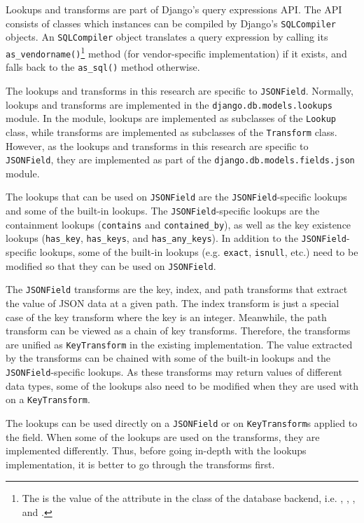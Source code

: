 Lookups and transforms are part of Django's query expressions API. The API
consists of classes which instances can be compiled by Django's
\verb|SQLCompiler| objects. An \verb|SQLCompiler| object translates a query
expression by calling its \verb|as_vendorname()|\footnote{The 
is the value of the  attribute in the  class
of the database backend, i.e. , , ,
and .} method (for vendor-specific implementation) if it exists,
and falls back to the \verb|as_sql()| method otherwise.

The lookups and transforms in this research are specific to \verb|JSONField|.
Normally, lookups and transforms are implemented in the
\verb|django.db.models.lookups| module. In the module, lookups are implemented
as subclasses of the \verb|Lookup| class, while transforms are implemented as
subclasses of the \verb|Transform| class. However, as the lookups and
transforms in this research are specific to \verb|JSONField|, they are
implemented as part of the \verb|django.db.models.fields.json| module.

The lookups that can be used on \verb|JSONField| are the
\verb|JSONField|-specific lookups and some of the built-in lookups. The
\verb|JSONField|-specific lookups are the containment lookups (\verb|contains|
and \verb|contained_by|), as well as the key existence lookups (\verb|has_key|,
\verb|has_keys|, and \verb|has_any_keys|). In addition to the
\verb|JSONField|-specific lookups, some of the built-in lookups (e.g.
\verb|exact|, \verb|isnull|, etc.) need to be modified so that they can be used
on \verb|JSONField|.

The \verb|JSONField| transforms are the key, index, and path transforms that
extract the value of JSON data at a given path. The index transform is just a
special case of the key transform where the key is an integer. Meanwhile, the
path transform can be viewed as a chain of key transforms. Therefore, the
transforms are unified as \verb|KeyTransform| in the existing implementation.
The value extracted by the transforms can be chained with some of the built-in
lookups and the \verb|JSONField|-specific lookups. As these transforms may
return values of different data types, some of the lookups also need to be
modified when they are used with on a \verb|KeyTransform|.

The lookups can be used directly on a \verb|JSONField| or on
\verb|KeyTransform|s applied to the field. When some of the lookups are used on
the transforms, they are implemented differently. Thus, before going in-depth
with the lookups implementation, it is better to go through the transforms
first.

